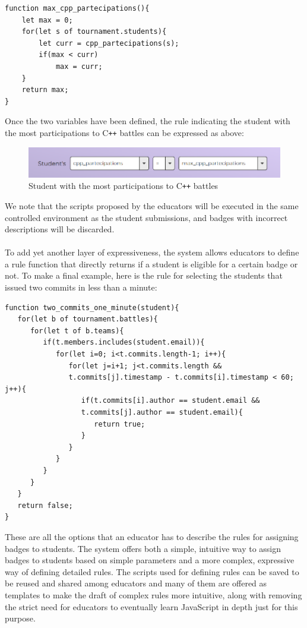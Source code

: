 \begin{verbatim}
function max_cpp_partecipations(){
    let max = 0;
    for(let s of tournament.students){
        let curr = cpp_partecipations(s);
        if(max < curr)
            max = curr;
    }
    return max;
}
\end{verbatim}
Once the two variables have been defined, the rule indicating the student with the most participations to C\texttt{++} battles can be expressed as above:

\begin{figure}[H]
    \centering
    \includegraphics[width=0.9\linewidth]{Images/UI_Badge_form3.png}
    \caption{Student with the most participations to C\texttt{++} battles}
    \label{fig:UI_form3}
\end{figure}
We note that the scripts proposed by the educators will be executed in the same controlled environment as the student submissions, and badges with incorrect descriptions will be discarded.\\
\\
To add yet another layer of expressiveness, the system allows educators to define a rule function that directly returns if a student is eligible for a certain badge or not. To make a final example, here is the rule for selecting the students that issued two commits in less than a minute:

\begin{verbatim}
function two_commits_one_minute(student){
   for(let b of tournament.battles){
      for(let t of b.teams){
         if(t.members.includes(student.email)){
            for(let i=0; i<t.commits.length-1; i++){
               for(let j=i+1; j<t.commits.length &&
               t.commits[j].timestamp - t.commits[i].timestamp < 60; j++){
                  if(t.commits[i].author == student.email &&
                  t.commits[j].author == student.email){
                     return true;
                  }
               }
            }
         }
      }
   }
   return false;
}
\end{verbatim}
These are all the options that an educator has to describe the rules for assigning badges to students. The system offers both a simple, intuitive way to assign badges to students based on simple parameters and a more complex, expressive way of defining detailed rules. The scripts used for defining rules can be saved to be reused and shared among educators and many of them are offered as templates to make the draft of complex rules more intuitive, along with removing the strict need for educators to eventually learn JavaScript in depth just for this purpose.